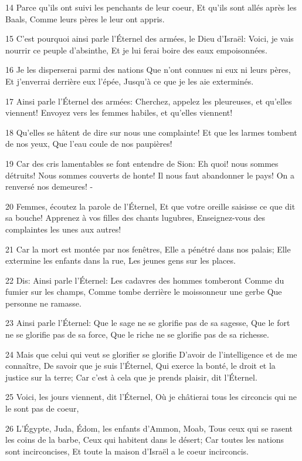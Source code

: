 \par 14 Parce qu'ils ont suivi les penchants de leur coeur, Et qu'ils sont allés après les Baals, Comme leurs pères le leur ont appris.
\par 15 C'est pourquoi ainsi parle l'Éternel des armées, le Dieu d'Israël: Voici, je vais nourrir ce peuple d'absinthe, Et je lui ferai boire des eaux empoisonnées.
\par 16 Je les disperserai parmi des nations Que n'ont connues ni eux ni leurs pères, Et j'enverrai derrière eux l'épée, Jusqu'à ce que je les aie exterminés.
\par 17 Ainsi parle l'Éternel des armées: Cherchez, appelez les pleureuses, et qu'elles viennent! Envoyez vers les femmes habiles, et qu'elles viennent!
\par 18 Qu'elles se hâtent de dire sur nous une complainte! Et que les larmes tombent de nos yeux, Que l'eau coule de nos paupières!
\par 19 Car des cris lamentables se font entendre de Sion: Eh quoi! nous sommes détruits! Nous sommes couverts de honte! Il nous faut abandonner le pays! On a renversé nos demeures! -
\par 20 Femmes, écoutez la parole de l'Éternel, Et que votre oreille saisisse ce que dit sa bouche! Apprenez à vos filles des chants lugubres, Enseignez-vous des complaintes les unes aux autres!
\par 21 Car la mort est montée par nos fenêtres, Elle a pénétré dans nos palais; Elle extermine les enfants dans la rue, Les jeunes gens sur les places.
\par 22 Dis: Ainsi parle l'Éternel: Les cadavres des hommes tomberont Comme du fumier sur les champs, Comme tombe derrière le moissonneur une gerbe Que personne ne ramasse.
\par 23 Ainsi parle l'Éternel: Que le sage ne se glorifie pas de sa sagesse, Que le fort ne se glorifie pas de sa force, Que le riche ne se glorifie pas de sa richesse.
\par 24 Mais que celui qui veut se glorifier se glorifie D'avoir de l'intelligence et de me connaître, De savoir que je suis l'Éternel, Qui exerce la bonté, le droit et la justice sur la terre; Car c'est à cela que je prends plaisir, dit l'Éternel.
\par 25 Voici, les jours viennent, dit l'Éternel, Où je châtierai tous les circoncis qui ne le sont pas de coeur,
\par 26 L'Égypte, Juda, Édom, les enfants d'Ammon, Moab, Tous ceux qui se rasent les coins de la barbe, Ceux qui habitent dans le désert; Car toutes les nations sont incirconcises, Et toute la maison d'Israël a le coeur incirconcis.

